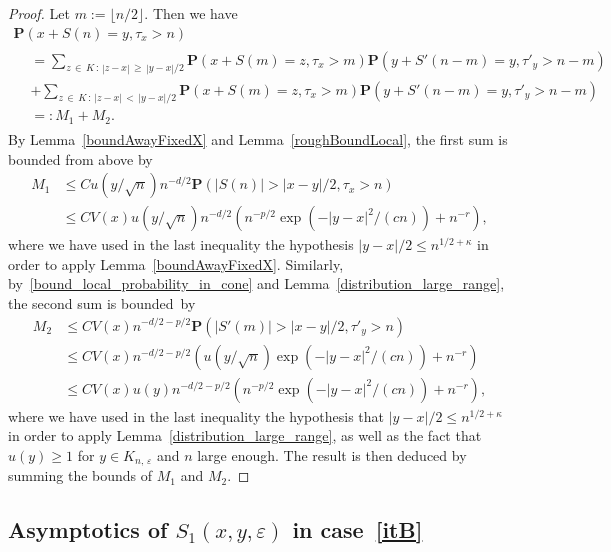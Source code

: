 \documentclass[AHL,Unicode,longabstracts,published]{cedram}
\newcommand{\pr}{\mathbf{P}}
\renewcommand{\epsilon}{\varepsilon}
\renewcommand{\leq}{\leqslant}
\renewcommand{\geq}{\geqslant}
\begin{document}
\begin{proof}
Let $m:=\lfloor n/2\rfloor$. Then we have
\begin{multline*}
\pr\left(x+S(n)=y,\tau_{x}>n\right)\\
\begin{aligned}
&=\sum_{z\,\in\,{K}\,:\,|z-x|\,\geq\,|y-x|/2}\pr\left(x+S(m)=z,\tau_{x}>m\right)\pr\left(y+S'(n-m)=y,\tau'_{y}>n-m\right)\\
&+\sum_{z\,\in\,{K}\,:\,|z-x|\,<\,| y-x|/2}\pr\left(x+S(m)=z,\tau_{x}>m\right)\pr\left(y+S'(n-m)=y,\tau'_{y}>n-m\right)\\
&=:M_{1}+M_{2}.
\end{aligned}
\end{multline*}
By Lemma~\ref{boundAwayFixedX} and Lemma~\ref{roughBoundLocal}, the first sum is bounded from above by
\begin{align*}
M_{1}&\leq Cu\left(y/\sqrt{n}\right)n^{-d/2}\pr\left(|S(n)|>| x-y|/2,\tau_{x}>n\right)\\
&\leq CV(x)u\left(y/\sqrt{n}\right)n^{-d/2}\left(n^{-p/2}\exp\left(-|y-x|^{2}/(c n)\right)+ n^{-r}\right),
\end{align*}
where we have used in the last inequality the hypothesis $| y-x|/2\leq n^{1/2+\kappa}$ in order to apply Lemma~\ref{boundAwayFixedX}. Similarly, by~\eqref{bound_local_probability_in_cone} and Lemma~\ref{distribution_large_range}, the second sum is bounded~by
\begin{align*}
M_{2}&\leq CV(x)n^{-d/2-p/2}\pr\left(\left|S'(m)\right|>|x-y|/2,\tau'_{y}>n\right)\\
&\leq CV(x)n^{-d/2-p/2}\left(u\left(y/\sqrt{n}\right)\exp\left(-|y-x|^{2}/(c n)\right)+ n^{-r}\right)\\
&\leq CV(x)u(y)n^{-d/2-p/2}\left(n^{-p/2}\exp\left(-|y-x|^{2}/(c n)\right)+ n^{-r}\right),
\end{align*}
where we have used in the last inequality the hypothesis that $|y-x|/2\leq n^{1/2+\kappa}$ in order to apply Lemma~\ref{distribution_large_range}, as well as the fact that $u(y)\geq 1$ for $y\in{K}_{n,\,\epsilon}$ and $n$ large enough. The result is then deduced by summing the bounds of $M_{1}$ and $M_{2}$.
\end{proof}



\subsection*{Asymptotics of \texorpdfstring{$S_1(x,y,\varepsilon)$}{S1(x,y, varepsilon)} in case~\eqref{itB}}
\end{document}
